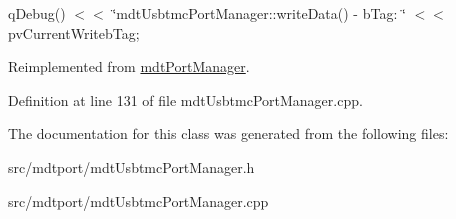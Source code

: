 qDebug() $<$$<$ \char`\"{}mdtUsbtmcPortManager::writeData() -\/ bTag: \char`\"{} $<$$<$ pvCurrentWritebTag; 



Reimplemented from \hyperlink{classmdt_port_manager_a8b60d53d6e553f15dedec916f9c1614b}{mdtPortManager}.



Definition at line 131 of file mdtUsbtmcPortManager.cpp.



The documentation for this class was generated from the following files:\begin{DoxyCompactItemize}
\item 
src/mdtport/mdtUsbtmcPortManager.h\item 
src/mdtport/mdtUsbtmcPortManager.cpp\end{DoxyCompactItemize}
